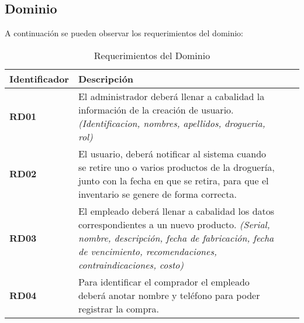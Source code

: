 \subsection{Dominio}
A continuación se pueden observar los requerimientos del dominio: \\
\begin{table}[h!]
	\begin{center}
		\begin{tabular}{| l |p{10cm} | l |p{30cm}|} 
			\hline
			\textbf{Identificador} & \textbf{Descripci\'on} \\
			\hline
			\textbf{RD01} & El administrador deberá llenar a cabalidad la información de la creación de usuario. \textit{(Identificacion,  nombres, apellidos, drogueria, rol)}\\ \hline
			\textbf{RD02} & El usuario, deberá notificar al sistema cuando se retire uno o varios productos de la droguería, junto con la fecha en que se retira, para que el inventario se genere de forma correcta.\\ \hline
			\textbf{RD03} & El empleado deberá llenar a cabalidad los datos correspondientes a un nuevo producto. \textit{(Serial, nombre, descripción, fecha de fabricación, fecha de vencimiento, recomendaciones, contraindicaciones, costo)}\\ \hline
			\textbf{RD04} & Para identificar el comprador el empleado deberá anotar nombre y teléfono para poder registrar la compra.\\ \hline
		\end{tabular}
		\caption{Requerimientos del Dominio}
		\label{reqDom}
	\end{center}
\end{table}

